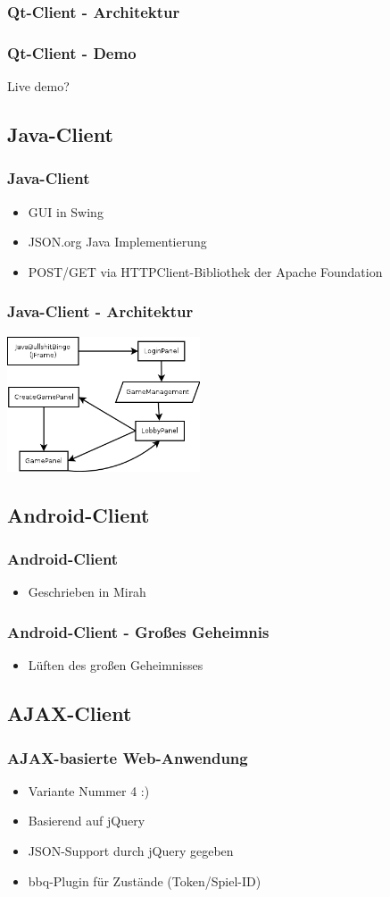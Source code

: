 \documentclass{beamer}
\begin{document}
\begin{frame}[fragile]
\frametitle{Qt-Client - Architektur}

\end{frame}

\begin{frame}[fragile]
\frametitle{Qt-Client - Demo}
Live demo?
\end{frame}

\subsection{Java-Client}
\begin{frame}[fragile]
\frametitle{Java-Client}
\begin{itemize}
\item GUI in Swing
\item JSON.org Java Implementierung
\item POST/GET via HTTPClient-Bibliothek der Apache Foundation
\end{itemize}
\end{frame}

\begin{frame}[fragile]
\frametitle{Java-Client - Architektur}
\begin{center}
\includegraphics[height=4cm]{JBB_Aufbau.png}
\end{center}
\end{frame}

\subsection{Android-Client}

\begin{frame}[fragile]
\frametitle{Android-Client}
\begin{itemize}
\item Geschrieben in Mirah
\end{itemize}
\end{frame}

\begin{frame}[fragile]
\frametitle{Android-Client - Großes Geheimnis}
\begin{itemize}
\item Lüften des großen Geheimnisses
\end{itemize}
\end{frame}

\subsection{AJAX-Client}

\begin{frame}[fragile]
\frametitle{AJAX-basierte Web-Anwendung}
\begin{itemize}
\item Variante Nummer 4 :)
\item Basierend auf jQuery
\item JSON-Support durch jQuery gegeben
\item bbq-Plugin für Zustände (Token/Spiel-ID)
\end{itemize}
\end{frame}
\end{document}
